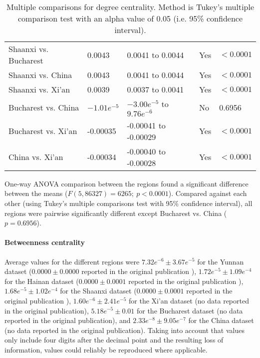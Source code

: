 \begin{table}[h]
\begin{mdframed}
\begin{tabular*}{\linewidth}{l|llll}
			Shaanxi vs. Bucharest & 0.0043 & 0.0041 to 0.0044 & Yes & $<0.0001$\\
			Shaanxi vs. China & 0.0043 & 0.0041 to 0.0044 & Yes & $<0.0001$\\
			Shaanxi vs. Xi'an & 0.0039 & 0.0037 to 0.0041 & Yes & $<0.0001$\\
			Bucharest vs. China & $-1.01e^{-5}$ & $-3.00e^{-5}$ to $9.76e^{-6}$ & No & 0.6956\\
			Bucharest vs. Xi'an & -0.00035 & -0.00041 to -0.00029 & Yes & $<0.0001$\\
			China vs. Xi'an & -0.00034 & -0.00040 to -0.00028 & Yes & $<0.0001$\\
			\hline
		\end{tabular*}
		\caption{Multiple comparisons for degree centrality. Method is Tukey's multiple comparison test with an alpha value of 0.05 (i.e. 95\% confidence interval).}
		\label{tab:degree_centrality_tukey}
	\end{mdframed}
\end{table}

One-way ANOVA comparison between the regions found a significant difference between the means ($F(5,86327) = 6265; \: p<0.0001$). Compared against each other (using Tukey's multiple comparisons test with 95\% confidence interval), all regions were pairwise significantly different except Bucharest vs. China ($p=0.6956$).

\paragraph{Betweenness centrality} Average values for the different regions were $7.32e^{-6}\pm3.67e^{-5}$ for the Yunnan dataset ($0.0000\pm0.0000$ reported in the original publication \cite{hainan_publication}), $1.72e^{-5}\pm1.09e^{-4}$ for the Hainan dataset ($0.0000\pm0.0001$ reported in the original publication \cite{hainan_publication}), $1.68e^{-5}\pm1.02e^{-4}$ for the Shaanxi dataset ($0.0000\pm0.0001$ reported in the original publication \cite{shaanxi_publication}), $1.60e^{-6}\pm2.41e^{-5}$ for the Xi'an dataset (no data reported in the original publication), $5.18e^{-5}\pm0.01$ for the Bucharest dataset (no data reported in the original publication), and $2.33e^{-8}\pm9.05e^{-7}$ for the China dataset (no data reported in the original publication). Taking into account that values only include four digits after the decimal point and the resulting loss of information, values could reliably be reproduced where applicable.

